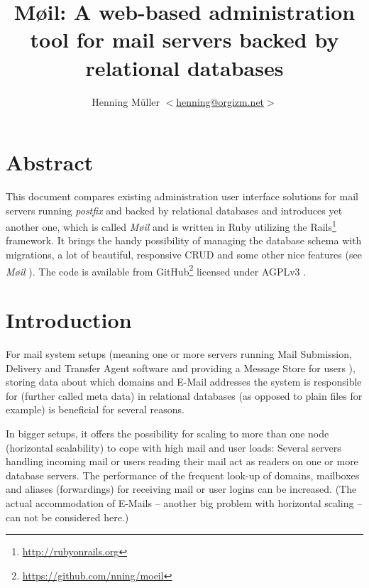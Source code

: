 \documentclass[12pt,a4paper]{scrartcl}
\begin{document}
	\title{Møil: A web-based administration tool for mail servers backed by relational databases}
	\author{Henning Müller $<$\href{mailto:henning@orgizm.net}{henning@orgizm.net}$>$}
	\date{}

	\maketitle


	\section*{Abstract}
		This document compares existing administration user interface solutions
		for mail servers running \emph{postfix} and backed by relational
		databases and introduces yet another one, which is called \emph{Møil}
		and is written in Ruby utilizing the
		\ac{Rails}\footnote{\url{http://rubyonrails.org}} framework. It brings
		the handy possibility of managing the database schema with migrations,
		a lot of beautiful, responsive \acs{CRUD} and some other nice features
		(see \emph{Møil} ). The code is available
		from GitHub\footnote{\url{https://github.com/nning/moeil}} licensed
		under AGPLv3 \cite{agpl}.

	\section*{Introduction}

		For mail system setups (meaning one or more servers running Mail
		Submission, Delivery and Transfer Agent software and providing a
		Message Store for users \cite{mail-architecture}), storing data about
		which domains and E-Mail addresses the system is responsible for
		(further called meta data) in relational databases (as opposed to plain
		files for example) is beneficial for several reasons.


		In bigger setups, it offers the possibility for scaling to more than
		one node (horizontal scalability) to cope with high mail and user
		loads: Several servers handling incoming mail or users reading their
		mail act as readers on one or more database servers. The performance of
		the frequent look-up of domains, mailboxes and aliases (forwardings)
		for receiving mail or user logins can be increased. (The actual
		accommodation of E-Mails -- another big problem with horizontal scaling
		-- can not be considered here.)
\end{document}
